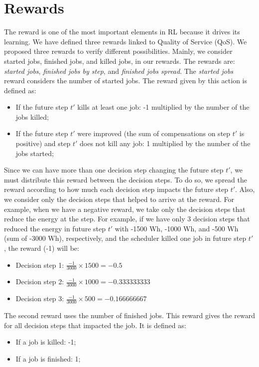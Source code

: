 \section{Rewards}

The reward is one of the most important elements in RL because it drives its learning. We have defined three rewards linked to Quality of Service (QoS). We proposed three rewards to verify different possibilities. Mainly, we consider started jobs, finished jobs, and killed jobs, in our rewards. The rewards are: \emph{started jobs}, \emph{finished jobs by step}, and \emph{finished jobs spread}. The \emph{started jobs} reward considers the number of started jobs. The reward given by this action is defined as:
\begin{itemize}
    \item If the future step $t'$ kills at least one job: -1 multiplied by the number of the jobs killed;
    \item If the future step $t'$ were improved (the sum of compensations on step $t'$ is positive) and step $t'$ does not kill any job: 1 multiplied by the number of the jobs started;
\end{itemize}

Since we can have more than one decision step changing the future step $t'$, we must distribute this reward between the decision steps. To do so, we spread the reward according to how much each decision step impacts the future step $t'$. Also, we consider only the decision steps that helped to arrive at the reward. For example, when we have a negative reward, we take only the decision steps that reduce the energy at the step. For example, if we have only 3 decision steps that reduced the energy in future step $t'$ with -1500 Wh, -1000 Wh, and -500 Wh (sum of -3000 Wh), respectively, and the scheduler killed one job in future step $t'$, the reward (-1) will be:
\begin{itemize}
    \item Decision step 1: \(\frac{-1}{3000} \times 1500 = -0.5\)
    \item Decision step 2: \(\frac{-1}{3000} \times 1000 = -0.333333333\)
    \item Decision step 3: \(\frac{-1}{3000} \times 500 = -0.166666667\)
\end{itemize}

The second reward uses the number of finished jobs. This reward gives the reward for all decision steps that impacted the job. It is defined as:
\begin{itemize}
    \item If a job is killed: -1;
    \item If a job is finished: 1;
\end{itemize}

